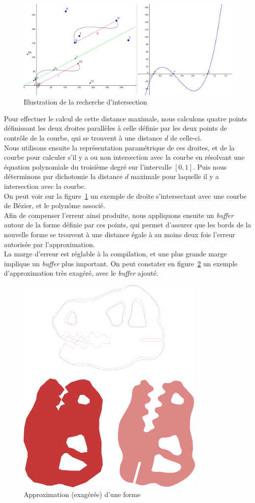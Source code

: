\begin{figure}[!htb]
\centering
\includegraphics[scale=0.35]{img/BEZER.png}
\caption{Illustration de la recherche d'intersection}
\label{fig:rotos}
\end{figure}

Pour effectuer le calcul de cette distance maximale, nous calculons quatre points définissant les deux droites parallèles à celle définie par les deux points de contrôle de la courbe, qui se trouvent à une distance $d$ de celle-ci.\\

Nous utilisons ensuite la représentation paramétrique de ces droites, et de la courbe pour calculer s'il y a ou non intersection avec la courbe en résolvant une équation polynomiale du troisième degré sur l'intervalle $[0,1]$. Puis nous déterminons par dichotomie la distance $d$ maximale pour laquelle il y a intersection avec la courbe.\\

On peut voir sur la figure~\ref{fig:rotos} un exemple de droite s'intersectant avec une courbe de Bézier, et le polynôme associé.\\

Afin de compenser l'erreur ainsi produite, nous appliquons ensuite un \textit{buffer} autour de la forme définie par ces points, qui permet d'assurer que les bords de la nouvelle forme se trouvent à une distance égale à au moins deux fois l'erreur autorisée par l'approximation.\\

La marge d'erreur est réglable à la compilation, et une plus grande marge implique un \textit{buffer} plus important. On peut constater en figure~\ref{fig:rotos2} un exemple d'approximation très exagéré, avec le \textit{buffer} ajouté.

\begin{figure}[!htb]
\centering
\includegraphics[scale=1.2]{img/approx.png} %
\caption{Approximation (exagérée) d'une forme}
\label{fig:rotos2}
\end{figure}